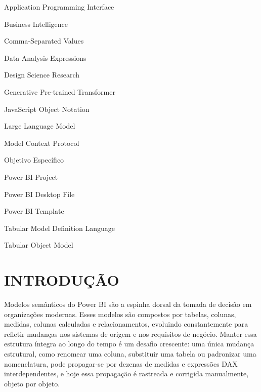 \documentclass[
    12pt,               %
    openright,          %
    oneside,            %
    a4paper,            %
    chapter=TITLE,      %
    section=TITLE,      %
    brazil              %
]{abntex2}
\begin{document}
\begin{siglas}
    \item[API] Application Programming Interface
    \item[BI] Business Intelligence
    \item[CSV] Comma-Separated Values
    \item[DAX] Data Analysis Expressions
    \item[DSR] Design Science Research
    \item[GPT] Generative Pre-trained Transformer
    \item[JSON] JavaScript Object Notation
    \item[LLM] Large Language Model
    \item[MCP] Model Context Protocol
    \item[OE] Objetivo Específico
    \item[PBIP] Power BI Project
    \item[PBIX] Power BI Desktop File
    \item[PBIT] Power BI Template
    \item[TMDL] Tabular Model Definition Language
    \item[TOM] Tabular Object Model
\end{siglas}

\tableofcontents*
\cleardoublepage

\textual

\chapter{INTRODUÇÃO}

Modelos semânticos do Power BI são a espinha dorsal da tomada de decisão em organizações modernas. Esses modelos são compostos por tabelas, colunas, medidas, colunas calculadas e relacionamentos, evoluindo constantemente para refletir mudanças nos sistemas de origem e nos requisitos de negócio. Manter essa estrutura íntegra ao longo do tempo é um desafio crescente: uma única mudança estrutural, como renomear uma coluna, substituir uma tabela ou padronizar uma nomenclatura, pode propagar-se por dezenas de medidas e expressões DAX interdependentes, e hoje essa propagação é rastreada e corrigida manualmente, objeto por objeto.
\end{document}
